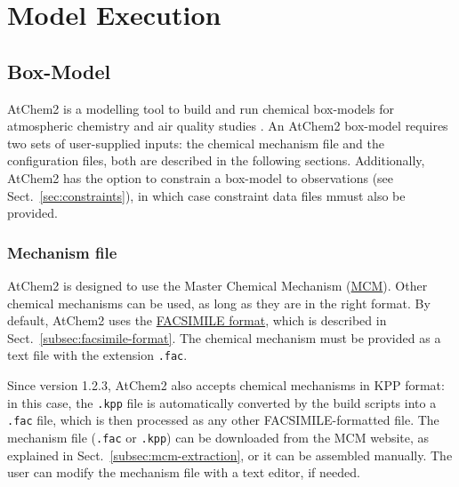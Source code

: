 %
%
%
%

\chapter{Model Execution} \label{ch:execution}

\section{Box-Model} \label{sec:box-model}

AtChem2 is a modelling tool to build and run chemical box-models for atmospheric chemistry and
air quality studies \citep{sommariva_2020}. An AtChem2 box-model requires two sets of
user-supplied inputs: the chemical mechanism file and the configuration files, both are
described in the following sections. Additionally, AtChem2 has the option to constrain a
box-model to observations (see Sect.~\ref{sec:constraints}), in which case constraint data
files mmust also be provided.

\subsection{Mechanism file} \label{subsec:mechanism-file}

AtChem2 is designed to use the Master Chemical Mechanism
(\href{https://mcm.york.ac.uk/MCM}{MCM}). Other chemical mechanisms can be used,
as long as they are in the right format. By default, AtChem2 uses the
\hyperref[subsec:facsimile-format]{FACSIMILE format}, which is described in
Sect.~\ref{subsec:facsimile-format}. The chemical mechanism must be provided as a
text file with the extension \texttt{.fac}.

Since version 1.2.3, AtChem2 also accepts chemical mechanisms in KPP format: in this case, the
\texttt{.kpp} file is automatically converted by the build scripts into a \texttt{.fac} file,
which is then processed as any other FACSIMILE-formatted file. The mechanism file
(\texttt{.fac} or \texttt{.kpp}) can be downloaded from the MCM website, as explained in
Sect.~\ref{subsec:mcm-extraction}, or it can be assembled manually. The user can modify the
mechanism file with a text editor, if needed.

